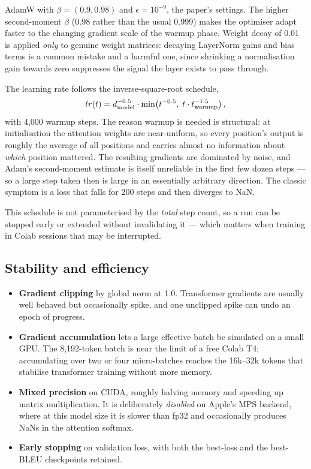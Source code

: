 \documentclass[11pt,a4paper]{article}
\begin{document}
AdamW with $\beta = (0.9, 0.98)$ and $\epsilon = 10^{-9}$, the paper's
settings. The higher second-moment $\beta$ (0.98 rather than the usual 0.999)
makes the optimiser adapt faster to the changing gradient scale of the warmup
phase. Weight decay of 0.01 is applied \emph{only} to genuine weight matrices:
decaying LayerNorm gains and bias terms is a common mistake and a harmful one,
since shrinking a normalisation gain towards zero suppresses the signal the
layer exists to pass through.

The learning rate follows the inverse-square-root schedule,
\begin{equation}
lr(t) = d_{\mathrm{model}}^{-0.5} \cdot
        \min\!\left(t^{-0.5},\; t \cdot t_{\text{warmup}}^{-1.5}\right),
\end{equation}
with 4{,}000 warmup steps. The reason warmup is needed is structural: at
initialisation the attention weights are near-uniform, so every position's
output is roughly the average of all positions and carries almost no
information about \emph{which} position mattered. The resulting gradients are
dominated by noise, and Adam's second-moment estimate is itself unreliable in
the first few dozen steps --- so a large step taken then is large in an
essentially arbitrary direction. The classic symptom is a loss that falls for
200 steps and then diverges to NaN.

This schedule is not parameterised by the \emph{total} step count, so a run can
be stopped early or extended without invalidating it --- which matters when
training in Colab sessions that may be interrupted.


\subsection{Stability and efficiency}

\begin{itemize}
  \item \textbf{Gradient clipping} by global norm at 1.0. Transformer gradients
    are usually well behaved but occasionally spike, and one unclipped spike
    can undo an epoch of progress.
  \item \textbf{Gradient accumulation} lets a large effective batch be
    simulated on a small GPU. The 8{,}192-token batch is near the limit of a
    free Colab T4; accumulating over two or four micro-batches reaches the
    16k--32k tokens that stabilise transformer training without more memory.
  \item \textbf{Mixed precision} on CUDA, roughly halving memory and speeding
    up matrix multiplication. It is deliberately \emph{disabled} on Apple's MPS
    backend, where at this model size it is slower than fp32 and occasionally
    produces NaNs in the attention softmax.
  \item \textbf{Early stopping} on validation loss, with both the best-loss and
    the best-BLEU checkpoints retained.
\end{itemize}
\end{document}
